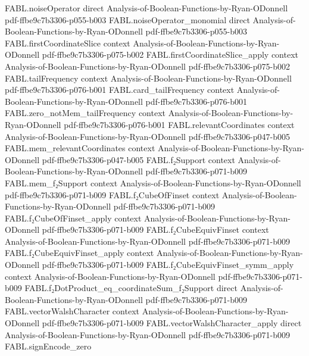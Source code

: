 \begin{theorem}
\proofstep
  {FABL.noiseOperator}
  {direct}
  {Analysis-of-Boolean-Functions-by-Ryan-ODonnell}
  {pdf-ffbe9c7b3306-p055-b003}
\proofstep
  {FABL.noiseOperator_monomial}
  {direct}
  {Analysis-of-Boolean-Functions-by-Ryan-ODonnell}
  {pdf-ffbe9c7b3306-p055-b003}
\proofstep
  {FABL.firstCoordinateSlice}
  {context}
  {Analysis-of-Boolean-Functions-by-Ryan-ODonnell}
  {pdf-ffbe9c7b3306-p075-b002}
\proofstep
  {FABL.firstCoordinateSlice_apply}
  {context}
  {Analysis-of-Boolean-Functions-by-Ryan-ODonnell}
  {pdf-ffbe9c7b3306-p075-b002}
\proofstep
  {FABL.tailFrequency}
  {context}
  {Analysis-of-Boolean-Functions-by-Ryan-ODonnell}
  {pdf-ffbe9c7b3306-p076-b001}
\proofstep
  {FABL.card_tailFrequency}
  {context}
  {Analysis-of-Boolean-Functions-by-Ryan-ODonnell}
  {pdf-ffbe9c7b3306-p076-b001}
\proofstep
  {FABL.zero_notMem_tailFrequency}
  {context}
  {Analysis-of-Boolean-Functions-by-Ryan-ODonnell}
  {pdf-ffbe9c7b3306-p076-b001}
\proofstep
  {FABL.relevantCoordinates}
  {context}
  {Analysis-of-Boolean-Functions-by-Ryan-ODonnell}
  {pdf-ffbe9c7b3306-p047-b005}
\proofstep
  {FABL.mem_relevantCoordinates}
  {context}
  {Analysis-of-Boolean-Functions-by-Ryan-ODonnell}
  {pdf-ffbe9c7b3306-p047-b005}
\proofstep
  {FABL.f₂Support}
  {context}
  {Analysis-of-Boolean-Functions-by-Ryan-ODonnell}
  {pdf-ffbe9c7b3306-p071-b009}
\proofstep
  {FABL.mem_f₂Support}
  {context}
  {Analysis-of-Boolean-Functions-by-Ryan-ODonnell}
  {pdf-ffbe9c7b3306-p071-b009}
\proofstep
  {FABL.f₂CubeOfFinset}
  {context}
  {Analysis-of-Boolean-Functions-by-Ryan-ODonnell}
  {pdf-ffbe9c7b3306-p071-b009}
\proofstep
  {FABL.f₂CubeOfFinset_apply}
  {context}
  {Analysis-of-Boolean-Functions-by-Ryan-ODonnell}
  {pdf-ffbe9c7b3306-p071-b009}
\proofstep
  {FABL.f₂CubeEquivFinset}
  {context}
  {Analysis-of-Boolean-Functions-by-Ryan-ODonnell}
  {pdf-ffbe9c7b3306-p071-b009}
\proofstep
  {FABL.f₂CubeEquivFinset_apply}
  {context}
  {Analysis-of-Boolean-Functions-by-Ryan-ODonnell}
  {pdf-ffbe9c7b3306-p071-b009}
\proofstep
  {FABL.f₂CubeEquivFinset_symm_apply}
  {context}
  {Analysis-of-Boolean-Functions-by-Ryan-ODonnell}
  {pdf-ffbe9c7b3306-p071-b009}
\proofstep
  {FABL.f₂DotProduct_eq_coordinateSum_f₂Support}
  {direct}
  {Analysis-of-Boolean-Functions-by-Ryan-ODonnell}
  {pdf-ffbe9c7b3306-p071-b009}
\proofstep
  {FABL.vectorWalshCharacter}
  {context}
  {Analysis-of-Boolean-Functions-by-Ryan-ODonnell}
  {pdf-ffbe9c7b3306-p071-b009}
\proofstep
  {FABL.vectorWalshCharacter_apply}
  {direct}
  {Analysis-of-Boolean-Functions-by-Ryan-ODonnell}
  {pdf-ffbe9c7b3306-p071-b009}
\proofstep
  {FABL.signEncode_zero}

\end{theorem}
